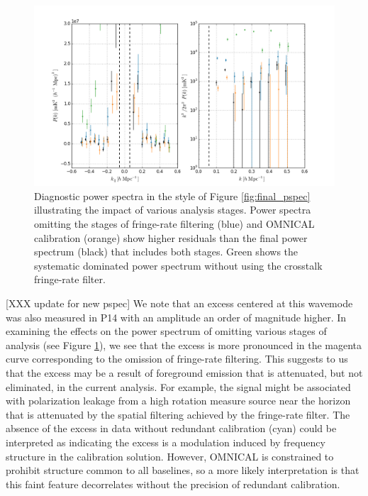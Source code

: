 \documentclass[twocolumn,numberedappendix]{emulateapj} \shorttitle{PSA64}
\begin{document}
\begin{figure}\centering
\includegraphics[width=2\columnwidth]{plots/pspec_comparison.png}
\caption{
Diagnostic power spectra in the style of Figure \ref{fig:final_pspec}
illustrating the impact of various analysis stages.
Power spectra omitting the stages of fringe-rate filtering (blue) and 
OMNICAL calibration (orange) show higher residuals than the final power
spectrum (black) that includes both stages. Green shows the systematic
dominated power spectrum without using the crosstalk fringe-rate filter.
}\label{fig:pspec_comp}
\end{figure}


[XXX update for new pspec]
We note that an excess centered at this wavemode was also
measured in P14 with an amplitude an order of magnitude higher.
In examining the effects on the power
spectrum of omitting various stages of analysis (see Figure \ref{fig:pspec_comp}), we
see that the excess is more pronounced in the magenta curve corresponding 
to the omission of fringe-rate filtering.
This suggests to us that the excess may be a result of foreground emission that is attenuated,
but not eliminated, in the current analysis.  
For example, the signal might be associated with
polarization leakage from a high rotation measure source near the horizon that
is attenuated by the spatial filtering achieved by the fringe-rate filter.
The absence of the excess in data without redundant calibration
(cyan) could be interpreted as indicating the excess is a modulation induced by frequency structure
in the calibration solution.  However, OMNICAL is constrained
to prohibit structure common to all baselines, so a more likely interpretation is that 
this faint feature decorrelates without the precision of redundant calibration.
\end{document}
